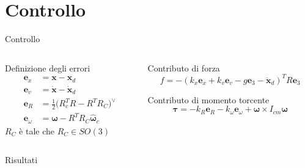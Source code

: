 \documentclass[]{beamer}
\begin{document}
	
	\section{Controllo}
	
	\begin{frame}{Controllo}
		\centering
		\begin{columns}
			\begin{column}{.45\textwidth}
				\setlength\abovedisplayskip{-10pt}
				\centering
				\begin{block}{Definizione degli errori}
					\begin{align*}
						\mathbf{e}_x &= \mathbf{x} - \mathbf{x}_d \\ 
						\mathbf{e}_v &= \dot{\mathbf{x}} - \dot{\mathbf{x}}_d \\
						\mathbf{e}_R &= \frac{1}{2}\bigl(R_c^TR-R^TR_C \bigl)^{\vee} \\
						\mathbf{e}_{\omega} &= \boldsymbol{\omega} - R^TR_C\hat{\boldsymbol{\omega}}_c
					\end{align*}
					$R_C$ è tale che $R_C \in SO(3)$
				\end{block}
			\end{column}
			\begin{column}{.55\textwidth}
				\centering
				\begin{block}{Contributo di forza}
					\setlength\abovedisplayskip{-10pt}
					\begin{equation*}
						f = -(k_x\mathbf{e}_x+k_v\mathbf{e}_v-g\mathbf{e}_3-\ddot{\mathbf{x}}_d)^TR\mathbf{e}_3
					\end{equation*}
				\end{block}
				\begin{block}{Contributo di momento torcente}
					\setlength\abovedisplayskip{-10pt}
					\begin{equation*}
						\boldsymbol{\tau} = -k_R\mathbf{e}_R - k_{\omega}\boldsymbol{e}_{\omega} + \boldsymbol{\omega}\times I_{cm}\boldsymbol{\omega}
					\end{equation*}
				\end{block}
			\end{column}
		\end{columns}
		\begin{figure}
			
		\end{figure}
	\end{frame}
	
	\begin{frame}{Risultati}
		\centering
		\begin{figure}
			
		\end{figure}
	\end{frame}
	
\end{document}
